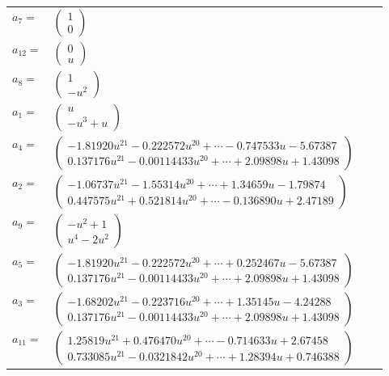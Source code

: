 \documentclass[1p]{elsarticle_modified}
\theoremstyle{definition}
\begin{document}
\begin{tabular}{m{7pt} m{180pt} m{7pt} m{180pt} }
\flushright $a_{7}=$&$\begin{pmatrix}1\\0\end{pmatrix}$ \\
\flushright $a_{12}=$&$\begin{pmatrix}0\\u\end{pmatrix}$ \\
\flushright $a_{8}=$&$\begin{pmatrix}1\\- u^2\end{pmatrix}$ \\
\flushright $a_{1}=$&$\begin{pmatrix}u\\- u^3+u\end{pmatrix}$ \\
\flushright $a_{4}=$&$\begin{pmatrix}-1.81920 u^{21}-0.222572 u^{20}+\cdots-0.747533 u-5.67387\\0.137176 u^{21}-0.00114433 u^{20}+\cdots+2.09898 u+1.43098\end{pmatrix}$ \\
\flushright $a_{2}=$&$\begin{pmatrix}-1.06737 u^{21}-1.55314 u^{20}+\cdots+1.34659 u-1.79874\\0.447575 u^{21}+0.521814 u^{20}+\cdots-0.136890 u+2.47189\end{pmatrix}$ \\
\flushright $a_{9}=$&$\begin{pmatrix}- u^2+1\\u^4-2 u^2\end{pmatrix}$ \\
\flushright $a_{5}=$&$\begin{pmatrix}-1.81920 u^{21}-0.222572 u^{20}+\cdots+0.252467 u-5.67387\\0.137176 u^{21}-0.00114433 u^{20}+\cdots+2.09898 u+1.43098\end{pmatrix}$ \\
\flushright $a_{3}=$&$\begin{pmatrix}-1.68202 u^{21}-0.223716 u^{20}+\cdots+1.35145 u-4.24288\\0.137176 u^{21}-0.00114433 u^{20}+\cdots+2.09898 u+1.43098\end{pmatrix}$ \\
\flushright $a_{11}=$&$\begin{pmatrix}1.25819 u^{21}+0.476470 u^{20}+\cdots-0.714633 u+2.67458\\0.733085 u^{21}-0.0321842 u^{20}+\cdots+1.28394 u+0.746388\end{pmatrix}$ \\

\end{tabular}
\end{document}
